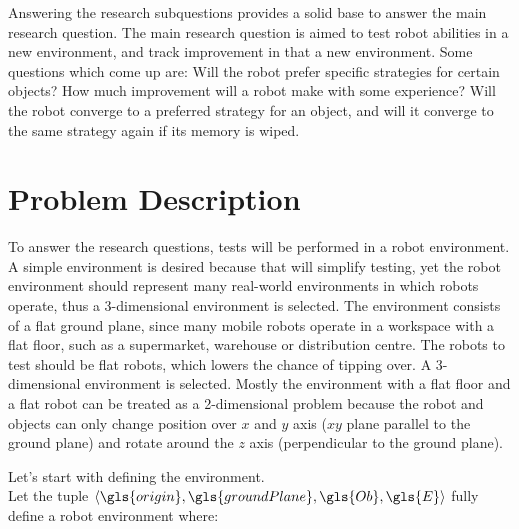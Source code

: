 Answering the research subquestions provides a solid base to answer the main research question. The main research question is aimed to test robot abilities in a new environment, and track improvement in that a new environment. Some questions which come up are: Will the robot prefer specific strategies for certain objects? How much improvement will a robot make with some experience? Will the robot converge to a preferred strategy for an object, and will it converge to the same strategy again if its memory is wiped.\bs

\section{Problem Description}%
\label{sec:problem_description}
To answer the research questions, tests will be performed in a robot environment. A simple environment is desired because that will simplify testing, yet the robot environment should represent many real-world environments in which robots operate, thus a 3-dimensional environment is selected. The environment consists of a flat ground plane, since many mobile robots operate in a workspace with a flat floor, such as a supermarket, warehouse or distribution centre. The robots to test should be flat robots, which lowers the chance of tipping over. A 3-dimensional environment is selected. Mostly the environment with a flat floor and a flat robot can be treated as a 2-dimensional problem because the robot and objects can only change position over $x$ and $y$ axis ($xy$ plane parallel to the ground plane) and rotate around the $z$ axis (perpendicular to the ground plane).\bs

Let's start with defining the environment.\\Let the tuple $\left\langle \gls{origin}, \gls{groundPlane}, \gls{Ob}, \gls{E} \right\rangle$ fully define a robot environment where:\bs

